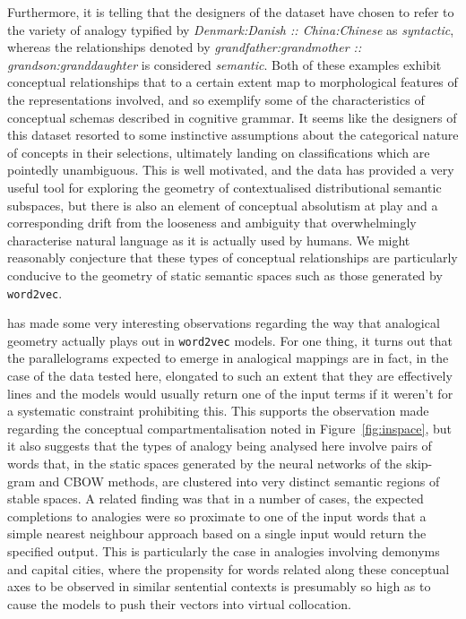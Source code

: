 Furthermore, it is telling that the designers of the dataset have chosen to refer to the variety of analogy typified by \emph{Denmark:Danish :: China:Chinese} as \emph{syntactic}, whereas the relationships denoted by \emph{grandfather:grandmother :: grandson:granddaughter} is considered \emph{semantic}.  Both of these examples exhibit conceptual relationships that to a certain extent map to morphological features of the representations involved, and so exemplify some of the characteristics of conceptual schemas described in  cognitive grammar.  It seems like the designers of this dataset resorted to some instinctive assumptions about the categorical nature of concepts in their selections, ultimately landing on classifications which are pointedly unambiguous.  This is well motivated, and the data has provided a very useful tool for exploring the geometry of contextualised distributional semantic subspaces, but there is also an element of conceptual absolutism at play and a corresponding drift from the looseness and ambiguity that overwhelmingly characterise natural language as it is actually used by humans.  We might reasonably conjecture that these types of conceptual relationships are particularly conducive to the geometry of static semantic spaces such as those generated by \texttt{word2vec}.

\cite{Linzen2016} has made some very interesting observations regarding the way that analogical geometry actually plays out in \texttt{word2vec} models.  For one thing, it turns out that the parallelograms expected to emerge in analogical mappings are in fact, in the case of the data tested here, elongated to such an extent that they are effectively lines and the models would usually return one of the input terms if it weren't for a systematic constraint prohibiting this.  This supports the observation made regarding the conceptual compartmentalisation noted in Figure~\ref{fig:inspace}, but it also suggests that the types of analogy being analysed here involve pairs of words that, in the static spaces generated by the neural networks of the skip-gram and CBOW methods, are clustered into very distinct semantic regions of stable spaces.  A related finding was that in a number of cases, the expected completions to analogies were so proximate to one of the input words that a simple nearest neighbour approach based on a single input would return the specified output.  This is particularly the case in analogies involving demonyms and capital cities, where the propensity for words related along these conceptual axes to be observed in similar sentential contexts is presumably so high as to cause the models to push their vectors into virtual collocation.

